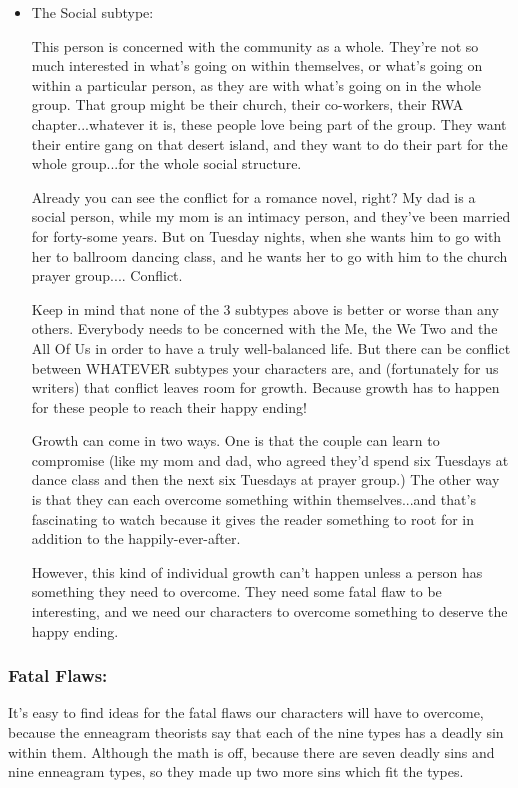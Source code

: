 \documentclass[openleft,oneside,showtrims]{memoir}
\begin{document}
\begin{itemize}
\item The Social subtype:
\label{sec:org906809d}

This person is concerned with the community as a whole. They're not so much interested in what's going on within themselves, or what's going on within a particular person, as they are with what's going on in the whole group. That group might be their church, their co-workers, their RWA chapter...whatever it is, these people love being part of the group. They want their entire gang on that desert island, and they want to do their part for the whole group...for the whole social structure.

Already you can see the conflict for a romance novel, right? My dad is a social person, while my mom is an intimacy person, and they've been married for forty-some years. But on Tuesday nights, when she wants him to go with her to ballroom dancing class, and he wants her to go with him to the church prayer group.... Conflict.

Keep in mind that none of the 3 subtypes above is better or worse than any others. Everybody needs to be concerned with the Me, the We Two and the All Of Us in order to have a truly well-balanced life. But there can be conflict between WHATEVER subtypes your characters are, and (fortunately for us writers) that conflict leaves room for growth. Because growth has to happen for these people to reach their happy ending!

Growth can come in two ways. One is that the couple can learn to compromise (like my mom and dad, who agreed they'd spend six Tuesdays at dance class and then the next six Tuesdays at prayer group.) The other way is that they can each overcome something within themselves...and that's fascinating to watch because it gives the reader something to root for in addition to the happily-ever-after.

However, this kind of individual growth can't happen unless a person has something they need to overcome. They need some fatal flaw to be interesting, and we need our characters to overcome something to deserve the happy ending.
\end{itemize}

\subsubsection*{Fatal Flaws:}
\label{sec:org3230275}

It's easy to find ideas for the fatal flaws our characters will have to overcome, because 
the enneagram theorists say that each of the nine types has a deadly sin within them. Although the math is off, because there are seven deadly sins and nine enneagram types, so they made up two more sins which fit the types.
\end{document}
